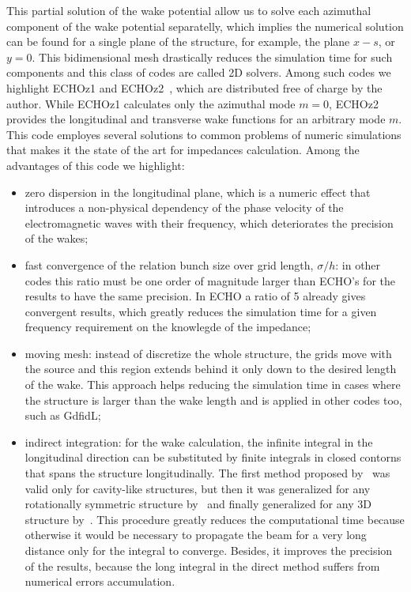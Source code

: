     This partial solution of the wake potential allow us to solve each azimuthal component of the wake potential separatelly, which implies the numerical solution can be found for a single plane of the structure, for example, the plane $x-s$, or $y=0$. This bidimensional mesh drastically reduces the simulation time for such components and this class of codes are called 2D solvers. Among such codes we highlight ECHOz1 and ECHOz2~\cite{Zagorodnov2003, Zagorodnov2005, Zagorodnov2006a}, which are distributed free of charge by the author. While ECHOz1 calculates only the azimuthal mode $m=0$, ECHOz2 provides the longitudinal and transverse wake functions for an arbitrary mode $m$.  This code employes several solutions to common problems of numeric simulations that makes it the state of the art for impedances calculation. Among the advantages of this code we highlight:
    \begin{itemize}
	    \item zero dispersion in the longitudinal plane, which is a numeric effect that introduces a non-physical dependency of the phase velocity of the electromagnetic waves with their frequency, which deteriorates the precision of the wakes;
	    \item fast convergence of the relation bunch size over grid length, $\sigma/h$: in other codes this ratio must be one order of magnitude larger than ECHO's for the results to have the same precision. In ECHO a ratio of \SI{5}{} already gives convergent results, which greatly reduces the simulation time for a given frequency requirement on the knowlegde of the impedance;
	    \item moving mesh: instead of discretize the whole structure, the grids move with the source and this region extends behind it only down to the desired length of the wake. This approach helps reducing the simulation time in cases where the structure is larger than the wake length and is applied in other codes too, such as GdfidL;
	    \item indirect integration: for the wake calculation, the infinite integral in the longitudinal direction can be substituted by finite integrals in closed contorns that spans the structure longitudinally. The first method proposed by~ was valid only for cavity-like structures, but then it was generalized for any rotationally symmetric structure by~ and finally generalized for any 3D structure by~. This procedure greatly reduces the computational time because otherwise it would be necessary to propagate the beam for a very long distance only for the integral to converge. Besides, it improves the precision of the results, because the long integral in the direct method suffers from numerical errors accumulation.
    \end{itemize}

